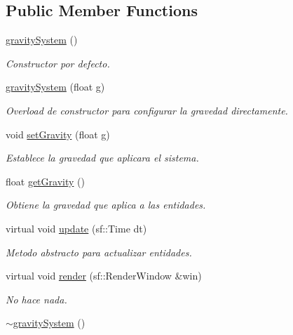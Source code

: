 \subsection*{Public Member Functions}
\begin{DoxyCompactItemize}
\item 
\hyperlink{classant_1_1gravity_system_ab77e4a4cd9ff0158ca30d921327893c5}{gravity\+System} ()
\begin{DoxyCompactList}\small\item\em Constructor por defecto. \end{DoxyCompactList}\item 
\hyperlink{classant_1_1gravity_system_a7f9c667686013182a60c0b842eed803b}{gravity\+System} (float g)
\begin{DoxyCompactList}\small\item\em Overload de constructor para configurar la gravedad directamente. \end{DoxyCompactList}\item 
void \hyperlink{classant_1_1gravity_system_a26471906bfe591b6c21f32081274ce2a}{set\+Gravity} (float g)
\begin{DoxyCompactList}\small\item\em Establece la gravedad que aplicara el sistema. \end{DoxyCompactList}\item 
float \hyperlink{classant_1_1gravity_system_a08c5c1e931bf21e1816fb675cc42d5c4}{get\+Gravity} ()
\begin{DoxyCompactList}\small\item\em Obtiene la gravedad que aplica a las entidades. \end{DoxyCompactList}\item 
virtual void \hyperlink{classant_1_1gravity_system_a60c3a55f5249bb6058b7673c64164457}{update} (sf\+::\+Time dt)
\begin{DoxyCompactList}\small\item\em Metodo abstracto para actualizar entidades. \end{DoxyCompactList}\item 
virtual void \hyperlink{classant_1_1gravity_system_a6671c949e17d7352ef7fb2a68dfad925}{render} (sf\+::\+Render\+Window \&win)
\begin{DoxyCompactList}\small\item\em No hace nada. \end{DoxyCompactList}\item 
\hyperlink{classant_1_1gravity_system_aa4dc4cf8639e2f5b7034054e12e481af}{$\sim$gravity\+System} ()

\end{DoxyCompactItemize}
